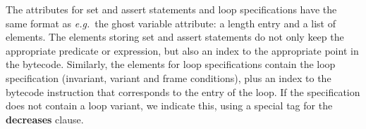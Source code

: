 The attributes for set and assert statements and loop specifications
have the same format as \emph{e.g.}\ the ghost variable attribute: a
length entry and a list of elements.  The elements storing set and
assert statements do not only keep the appropriate predicate or
expression, but also an index to the appropriate point in the
bytecode. Similarly, the elements for loop specifications contain the
loop specification (invariant, variant and frame conditions), plus an
index to the bytecode instruction that corresponds to the entry of the
loop. If the specification does not contain a loop variant, we
indicate this, using a special tag for the
\textbf{decreases} clause.



